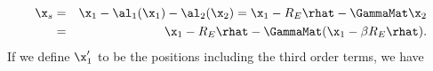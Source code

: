 \begin{eqnarray}
\x_s &=& \x_1 - \al_1(\x_1) - \al_2(\x_2) = \x_1 - R_E \rhat-  \GammaMat \x_2 \nonumber\\
&=& \x_1 - R_E \rhat -  \GammaMat (\x_1 - \beta R_E \rhat).
\label{eq:backgroundorder2}
\end{eqnarray}
If we define $\x_1'$ to be the positions including the third order terms, we have
  
  